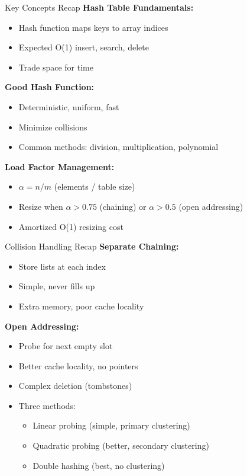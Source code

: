 \documentclass[aspectratio=169]{beamer}
\begin{document}
\begin{frame}{Key Concepts Recap}
  \textbf{Hash Table Fundamentals:}
  \begin{itemize}
    \item Hash function maps keys to array indices
    \item Expected O(1) insert, search, delete
    \item Trade space for time
  \end{itemize}

  \vspace{0.3cm}
  \textbf{Good Hash Function:}
  \begin{itemize}
    \item Deterministic, uniform, fast
    \item Minimize collisions
    \item Common methods: division, multiplication, polynomial
  \end{itemize}

  \vspace{0.3cm}
  \textbf{Load Factor Management:}
  \begin{itemize}
    \item $\alpha = n / m$ (elements / table size)
    \item Resize when $\alpha > 0.75$ (chaining) or $\alpha > 0.5$ (open addressing)
    \item Amortized O(1) resizing cost
  \end{itemize}
\end{frame}

\begin{frame}{Collision Handling Recap}
  \textbf{Separate Chaining:}
  \begin{itemize}
    \item Store lists at each index
    \item Simple, never fills up
    \item Extra memory, poor cache locality
  \end{itemize}

  \vspace{0.3cm}
  \textbf{Open Addressing:}
  \begin{itemize}
    \item Probe for next empty slot
    \item Better cache locality, no pointers
    \item Complex deletion (tombstones)
    \item Three methods:
      \begin{itemize}
        \item Linear probing (simple, primary clustering)
        \item Quadratic probing (better, secondary clustering)
        \item Double hashing (best, no clustering)
      \end{itemize}
  \end{itemize}
\end{frame}
\end{document}
